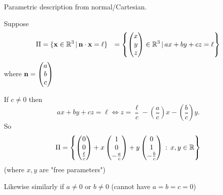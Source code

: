 \documentclass[10pt, a4paper]{article}
\begin{document}
Parametric description from normal/Cartesian.

Suppose 
\begin{align*}
    \Pi &= \{\mathbf{x} \in \mathbb{R} ^ 3 \,|\, \mathbf{n\cdot x} = \ell\}
    &= \left\{\begin{pmatrix} x \\ y \\ z
    \end{pmatrix} \in \mathbb{R} ^ 3 \,|\, ax + by + cz = \ell\right\}
\end{align*}
where $\mathbf{n} = \begin{pmatrix} a \\ b \\ c \end{pmatrix}$

If $c \neq 0$ then \[
ax + by + cz = \ell \iff z = \frac{\ell}{c} - \left(\frac{a}{c}\right)x - \left(\frac{b}{c}\right)y.
\]
So
\[
\Pi = \left\{ \begin{pmatrix}
    0 \\ 0 \\ \frac{\ell}{c}
\end{pmatrix} + x\begin{pmatrix}
    1 \\ 0 \\ -\frac{a}{c} 
\end{pmatrix} + y\begin{pmatrix}
    0 \\ 1 \\ -\frac{b}{c}
\end{pmatrix}\,:\, x, y \in \mathbb{R} \right\}
\]
(where $x, y$ are "free parameters")

Likewise similarly if $a \neq 0$ or $b \neq 0$ (cannot have $a = b = c = 0$)
\end{document}
